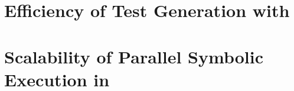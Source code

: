 \section{Efficiency of Test Generation with \chef}
\label{sec:eval:chef-efficiency}


\section{Scalability of Parallel Symbolic Execution in \cnine}
\label{sec:eval:cnine-efficiency}


